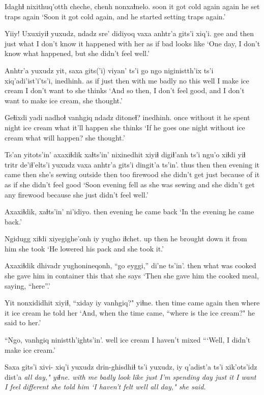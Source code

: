 \documentclass[12pt]{article}
\begin{document}
\gll Idaghɬ nixithuq'otth cheche, chenh nonxaɬnelo.
soon {it got cold} again again {he set traps again}
\glt `Soon it got cold again, and he started setting traps again.'
\glend

\gll Yiiy! Uxuxiyiɬ yuxudz, ndadz sre' didiyoq vaxa anhtr'a gits'i xiq'i.
gee {and then} just what {I don't know} {it happened} {with her} {as if} {bad} {looks like}
\glt `One day, I don't know what happened, but she didn't feel well.'
\glend

\gll Anhtr'a yuxudz yit, saxa gits('i) viyan' ts'i go ngo niginistth'ix ts'i xiq'adi'ist'i'ts'i, inedhinh.
{as if} just then {with me} badly no {} this well {I make ice cream} {} {I don't want to} {she thinks}
\glt `And so then, I don't feel good, and I don't want to make ice cream, she thought.'
\glend

\gll Geɬixdi yadi nadhoɬ vanhgiq ndadz ditoneɬ? inedhinh.
{once} {without it} {he spent night} {ice cream} what {it'll happen} {she thinks}
\glt `If he goes one night without ice cream what will happen? she thought.'
\glend

\gll Ts'an yitots'in' axaxiɬdik xaɬts'in' nixinedhit xiyiɬ digiɬ'anh ts'i ngu'o xiɬdi yiɬ tritr {de'iɬ'elts'i} yuxudz vaxa anhtr'a {gits'i dingit'a} ts'in'.
thus then then evening {it came} then {she's sewing} {} outside then too firewood {she didn't get} just {because of it} {as if} {she didn't feel good} {}
\glt `Soon evening fell as she was sewing and she didn't get any firewood because she just didn't feel well.'
\glend

\gll Axaxiɬdik, xaɬts'in' ni'idiyo.
then evening {he came back}
\glt `In the evening he came back.'
\glend

\gll Ngidugg xiɬdi xiyegighe'onh iy yugho iɬchet.
up then {he brought down} it {from him} {she took}
\glt `He lowered his pack and she took it.'
\glend

\gll Axaxiɬdik dhivadr yughonineqonh, ``go eyggi,'' di'ne ts'in'.
then {what was cooked} {she gave him in container} this that {she says} {} 
\glt `Then she gave him the cooked meal, saying, ``here''.'
\glend

\gll Yit nonxididhit xiyiɬ, ``xiday iy vanhgiq?" yiɬne.
then {time came again} then where it {ice cream} {he told her}
\glt `And, when the time came, ``where is the ice cream?" he said to her.'
\glend

\gll ``Ngo, vanhgiq {ninistth'ights'in'.}
well {ice cream} {I haven't mixed}
\glt ```Well, I didn't make ice cream.'
\glend

\gll Saxa gits'i xivi- xiq'i yuxudz {drin-ghisdhiɬ} ts'i yuxudz, iy q'adist'a ts'i {xik'ots'idz dist'a} \em{all day,"} yiɬne.
{with me} badly {} {look like} just {I'm spending day} {} just it {I want} {} {I feel different} {} {she told him}
\glt `I haven't felt well all day," she said. 
\glend
\end{document}
